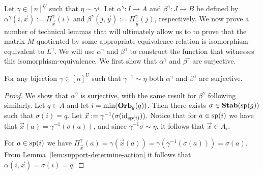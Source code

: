 \documentclass[../paper.tex]{subfiles}
\begin{document}
Let $\gamma \in [n]^{\underline{U}}$ such that $\eta \sim \gamma^{_1}$. Let
  $\alpha^{\gamma}: I \rightarrow A$ and $\beta^{\gamma}: J \rightarrow B$ be
  defined by $\alpha^{\gamma} (i, \vec{x}) := \Pi^{\gamma}_{\vec{x}}(i)$ and
  $\beta^{\gamma} (j, \vec{y}) := \Pi^{\gamma}_{\vec{y}}(j)$, respectively. We
  now prove a number of technical lemmas that will ultimately allow us to to
  prove that the matrix $M$ quotiented by some appropriate equivalence relation
  is isomorphism-equivalent to $L^{\gamma}$. We will use $\alpha^{\gamma}$ and
  $\beta^{\gamma}$ to construct the function that witnesses this
  isomorphism-equivalence. We first show that $\alpha^{\gamma}$ and
  $\beta^{\gamma}$ are surjective.

\begin{lem} 
	For any bijection $\gamma \in [n]^{\underline{U}}$ such that $\gamma^{-1} \sim
  \eta$ both $\alpha^{\gamma}$ and $\beta^{\gamma}$ are surjective.
  \label{lem:alpha-beta-surjective}
\end{lem}
\begin{proof}
	We show that $\alpha^{\gamma}$ is surjective, with the same result for
  $\beta^{\gamma}$ following similarly. Let $q \in A$ and let $i = \min
  (\text{\textbf{Orb}}_{g} (q))$. Then there exists $\sigma \in \text{\textbf{Stab}} (\text{sp} (g))$ such that $\sigma
  (i) = q$. Let $\vec{x} := \gamma^{-1} (\sigma (\operatorname{id}_{\text{sp}(i)}))$. Notice that
  for $a \in \text{sp}(i)$ we have that $\vec{x}(a) = \gamma^{-1} (\sigma (a))$,
  and since $\gamma^{-1} \sigma \sim \eta$, it follows that $\vec{x} \in A_i$.
		
	For $a \in \text{sp}(i)$ we have $\Pi^{\gamma}_{\vec{x}} (a) = \gamma
  (\vec{x}(a)) = \gamma (\gamma^{-1} (\sigma (a))) = \sigma (a)$. From
  Lemma~\ref{lem:support-determine-action} it follows that $\alpha(i, \vec{x}) =
  \sigma(i) = q$.
\end{proof}



\end{document}
